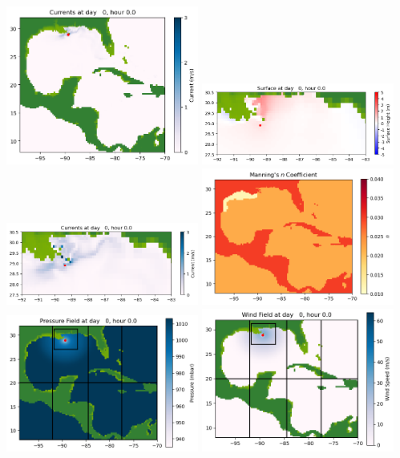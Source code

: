 \documentclass[11pt]{article}
\begin{document}
\includegraphics[width=0.475\textwidth]{frame0008fig1002.png}
\vskip 10pt 
\includegraphics[width=0.475\textwidth]{frame0008fig1003.png}
\includegraphics[width=0.475\textwidth]{frame0008fig1004.png}
\vskip 10pt 
\includegraphics[width=0.475\textwidth]{frame0008fig1005.png}
\includegraphics[width=0.475\textwidth]{frame0008fig1006.png}
\vskip 10pt 
\includegraphics[width=0.475\textwidth]{frame0008fig1007.png}
\end{document}
